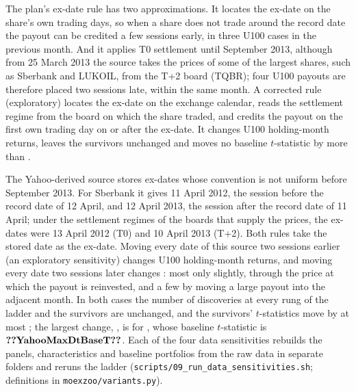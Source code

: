 \documentclass[11pt]{article}
\begin{document}
The plan's ex-date rule has two approximations. It locates the ex-date on the share's own trading days, so when a share
does not trade around the record date the payout can be credited a few sessions early, in three U100 cases in the
previous month. And it applies T0 settlement until September 2013, although from 25 March 2013 the source takes the prices of
some of the largest shares, such as Sberbank and LUKOIL, from the T+2 board (TQBR); four U100 payouts are therefore
placed two sessions late, within the same month. A corrected rule (exploratory) locates the ex-date on the exchange
calendar, reads the settlement regime from the board on which the share traded, and credits the payout on the first own
trading day on or after the ex-date. It changes  U100 holding-month returns, leaves the survivors
unchanged and moves no baseline $t$-statistic by more than .

The Yahoo-derived source stores ex-dates whose convention is not uniform before September 2013. For Sberbank it gives
11 April 2012, the session before the record date of 12 April, and 12 April 2013, the session after the record date
of 11 April; under the settlement regimes of the boards that supply the prices, the ex-dates were 13 April 2012 (T0)
and 10 April 2013 (T+2). Both rules take the stored date as the ex-date. Moving every date of this source two sessions
earlier (an exploratory sensitivity) changes  U100 holding-month returns, and moving every date
two sessions later changes : most only slightly, through the price at which the payout is
reinvested, and a few by moving a large payout into the adjacent month. In both cases the number of discoveries at every
rung of the ladder and the survivors are unchanged, and the survivors' $t$-statistics move by at most
; the largest change, , is for , whose baseline $t$-statistic is
$\val{YahooMaxDtBaseT}$. Each of the four data sensitivities rebuilds the panels, characteristics and baseline
portfolios from the raw data in separate folders and reruns the ladder (\texttt{scripts/09\_run\_data\_sensitivities.sh};
definitions in \texttt{moexzoo/variants.py}).
\end{document}
